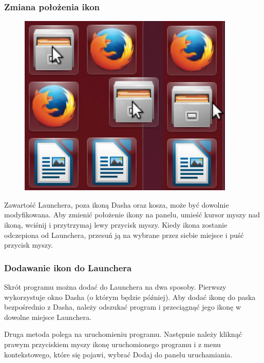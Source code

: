 \subsubsection{Zmiana położenia ikon}
\begin{figure}
	\vspace{-10pt}
	\includegraphics[width=\linewidth]{images/unity_launcher_zmiana_polozenia_ikon.png}
\end{figure}

Zawartość Launchera, poza ikoną Dasha oraz kosza, może być dowolnie modyfikowana. Aby zmienić położenie ikony na panelu, umieść kursor myszy nad ikoną, wciśnij i przytrzymaj lewy przycisk myszy. Kiedy ikona zostanie odczepiona od Launchera, przesuń ją na wybrane przez siebie miejsce i puść przycisk myszy.

\subsubsection{Dodawanie ikon do Launchera}
Skrót programu można dodać do Launchera na dwa sposoby. Pierwszy wykorzystuje okno Dasha (o którym będzie później). Aby dodać ikonę do paska bezpośrednio z Dasha, należy odszukać program i przeciągnąć jego ikonę w dowolne miejsce Launchera.

Druga metoda polega na uruchomieniu programu. Następnie należy kliknąć prawym przyciskiem myszy ikonę uruchomionego programu i z menu kontekstowego, które się pojawi, wybrać \textcolor{ubuntu_orange}{Dodaj do panelu uruchamiania}.

